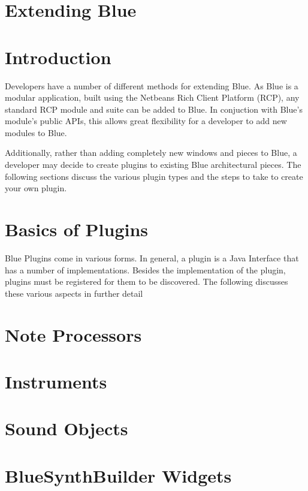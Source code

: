 \section{Extending Blue}\label{extendingBlue}

\section{Introduction}

Developers have a number of different methods for extending Blue. As
Blue is a modular application, built using the Netbeans Rich Client
Platform (RCP), any standard RCP module and suite can be added to Blue.
In conjuction with Blue's module's public APIs, this allows great
flexibility for a developer to add new modules to Blue.

Additionally, rather than adding completely new windows and pieces to
Blue, a developer may decide to create plugins to existing Blue
architectural pieces. The following sections discuss the various plugin
types and the steps to take to create your own plugin.

\section{Basics of Plugins}

Blue Plugins come in various forms. In general, a plugin is a Java
Interface that has a number of implementations. Besides the
implementation of the plugin, plugins must be registered for them to be
discovered. The following discusses these various aspects in further
detail

\section{Note Processors}

\section{Instruments}

\section{Sound Objects}

\section{BlueSynthBuilder Widgets}
